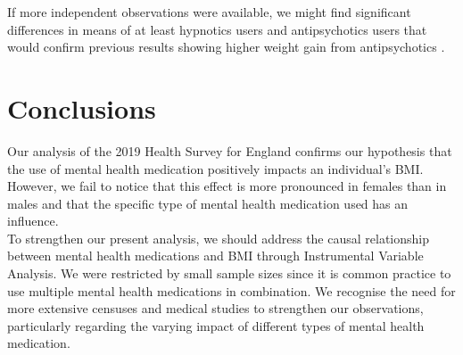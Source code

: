 \documentclass[12pt]{article}
\begin{document}
If more independent observations were available, we might find significant differences in means of at least hypnotics users and antipsychotics users that would confirm previous results showing higher weight gain from antipsychotics \citep{alonso}.



  

\newpage\section{Conclusions}

\hspace{\parindent} Our analysis of the 2019 Health Survey for England confirms our hypothesis that the use of mental health medication positively impacts an individual’s BMI. However, we fail to notice that this effect is more pronounced in females than in males and that the specific type of mental health medication used has an influence. \\

 To strengthen our present analysis, we should address the causal relationship between mental health medications and BMI through Instrumental Variable Analysis. We were restricted by small sample sizes since it is common practice to use multiple mental health medications in combination. We recognise the need for more extensive censuses and medical studies to strengthen our observations, particularly regarding the varying impact of different types of mental health medication. \\


\newpage


\end{document}
